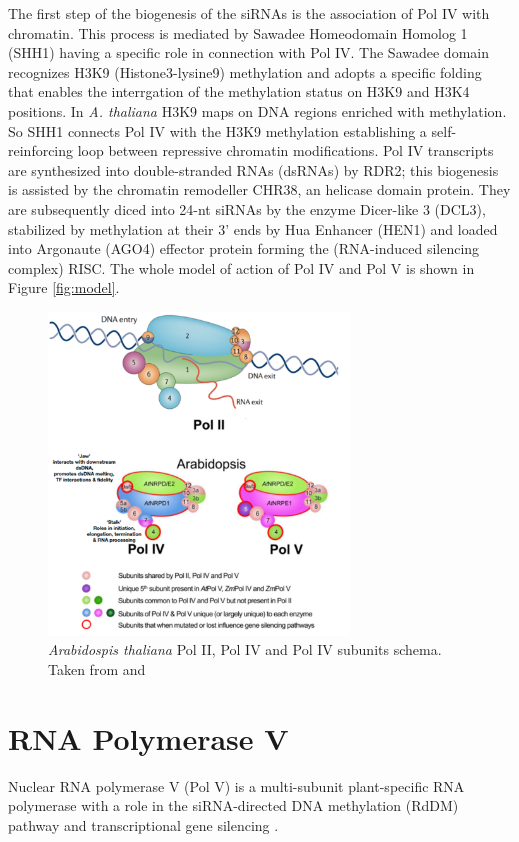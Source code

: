 \documentclass[a4paper, twocolumn]{article}
\begin{document}
The first step of the biogenesis of the siRNAs is the association of Pol IV with chromatin. This process is mediated by Sawadee Homeodomain Homolog 1 (SHH1) \cite{LAW2013} having a specific role in connection with Pol IV. The Sawadee domain recognizes H3K9 (Histone3-lysine9) methylation and adopts a specific folding that enables the interrgation of the methylation status on H3K9 and H3K4 positions. In \textit{A. thaliana} H3K9 maps on DNA regions enriched with methylation. So SHH1 connects Pol IV with the H3K9 methylation establishing a self-reinforcing loop between repressive chromatin modifications. 
Pol IV transcripts are synthesized into double-stranded RNAs (dsRNAs) by RDR2; this biogenesis is assisted by the chromatin remodeller CHR38, an helicase domain protein. They are subsequently diced into 24-nt siRNAs by the enzyme Dicer-like 3 (DCL3), stabilized by methylation at their 3' ends by Hua Enhancer (HEN1) and loaded into Argonaute (AGO4) effector protein forming the (RNA-induced silencing complex) RISC. 
The whole model of action of Pol IV and Pol V is shown in Figure \ref{fig:model}.

\begin{figure}
	\includegraphics[width=8cm]{my_subunits.png}
	\caption{\textit{Arabidospis thaliana} Pol II, Pol IV and Pol IV subunits schema. Taken from \cite{HAAG2011} and \cite{ZHOU2015}}
	\label{fig:subunits}
\end{figure}

\section{RNA Polymerase V}
Nuclear RNA polymerase V (Pol V) is a multi-subunit plant-specific RNA polymerase with a role in the siRNA-directed DNA methylation (RdDM) pathway and transcriptional gene silencing \cite{ZHOU2015}.
\end{document}

